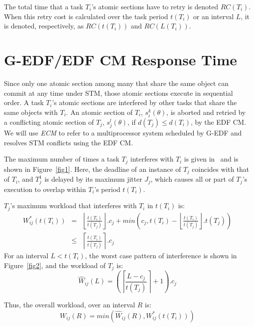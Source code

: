 \documentclass{sig-alternate}
\begin{document}
The total time that a task $T_i$'s atomic sections have to retry is denoted $RC(T_i)$.
When this retry cost is calculated over the task period $t(T_i)$ or an interval $L$, it is   denoted, respectively, as $RC(t(T_i))$ and $RC(L(T_i))$. 

\section{G-EDF/EDF CM Response Time}
\label{sec:g-edf-edf-cm}

Since only one atomic section among many that share the same object can commit at any time under STM, those atomic sections execute in sequential order.  A task $T_{i}$'s atomic sections are interfered by other tasks that share the same objects with $T_{i}$. An atomic section of $T_i$, $s_i^k(\theta)$, is aborted and retried by a conflicting atomic section of $T_j$, $s_j^l(\theta)$, if $d(T_j) \le d(T_i)$, by the EDF CM. We will use \emph{ECM} to refer to a multiprocessor system scheduled by G-EDF and resolves STM conflicts using the EDF CM. 



The maximum number of times a task $T_{j}$ interferes with $T_{i}$ is given in~\cite{key-2} and is shown in Figure~\ref{fig1}. 
Here, the deadline of an instance of $T_{j}$ coincides
with that of $T_{i}$, and $T_{j}^{1}$ is delayed by its maximum
jitter $J_{j}$, which causes all or part of $T_{j}$'s execution to overlap within $T_{i}$'s period $t(T_i)$.

$T_j$'s maximum workload that interferes with $T_i$ in $t(T_{i})$ is:
\begin{eqnarray}
W_{ij}^{*}\left(t\left(T_{i}\right)\right) & = & \left\lfloor\frac{t\left(T_{i}\right)}{t\left(T_{j}\right)}\right\rfloor .c_{j}+min\left(c_{j},t\left(T_{i}\right)-\left\lfloor\frac{t\left(T_{i}\right)}{t\left(T_{j}\right)}\right\rfloor .t\left(T_{j}\right)\right)\nonumber \\
 & \le & \left\lceil\frac{t\left(T_{i}\right)}{t\left(T_{j}\right)}\right\rceil .c_{j}
 \label{eq11}\end{eqnarray}
For an interval $L<t(T_{i})$, the worst case pattern of interference
is shown in Figure~\ref{fig2}, and the workload of $T_{j}$ is:
\begin{equation}
\hat{W}{}_{ij}\left(L\right)=\left(\left\lceil\frac{L-c_{j}}{t\left(T_{j}\right)}\right\rceil+1\right).c_{j}\label{eq12}\end{equation}

Thus, the overall workload, over an interval $R$ is:
\begin{equation}
W_{ij}\left(R\right)=min\left(\hat{W}_{ij}\left(R\right),W_{ij}^{*}\left(t\left(T_{i}\right)\right)\right)\label{eq13}\end{equation}
\end{document}
